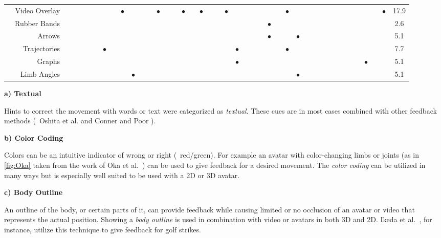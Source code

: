 \begin{table}[thp]
\begin{tiny}
{\begin{tabular}{|c|r|c|c|c|c|c|c|c|c|c|c|c|c|c|c|c|c|c|c|c|c|c|c|c|c|c|c|c|c|c|c|c|c|c|c|c|c|c|c|c|c|}
 & Video Overlay &  &  &  &  &  &  &  & $\bullet$ &  &  &  & $\bullet$ &  &  & $\bullet$ &  & $\bullet$ &  &  & $\bullet$ &  &  &  &  &  &  & $\bullet$ &  &  &  &  &  &  &  &  &  &  &  & $\bullet$ & 17.9 \\ \cline{2-42} 
 & Rubber Bands &  &  &  &  &  &  &  &  &  &  &  &  &  &  &  &  &  &  &  &  &  &  &  &  & $\bullet$ &  &  &  &  &  &  &  &  &  &  &  &  &  &  & 2.6 \\ \cline{2-42} 
 & Arrows &  &  &  &  &  &  &  &  &  &  &  &  &  &  &  &  &  &  &  &  &  &  &  &  & $\bullet$ &  &  & $\bullet$ &  &  &  &  &  &  &  &  &  &  &  & 5.1 \\ \cline{2-42} 
 & Trajectories &  &  &  &  &  & $\bullet$ &  &  &  &  &  &  &  &  &  &  &  &  &  &  & $\bullet$ &  &  &  &  &  & $\bullet$ &  &  &  &  &  &  &  &  &  &  &  &  & 7.7 \\ \cline{2-42} 
& Graphs &  &  &  &  &  &  &  &  &  &  &  &  &  &  &  &  &  &  &  &  & $\bullet$ &  &  &  &  &  &  &  &  &  &  &  &  &  &  &  & $\bullet$ &  &  & 5.1 \\ \cline{2-42} 
& Limb Angles &  &  &  &  &  &  &  &  & $\bullet$ &  &  &  &  &  &  &  &  &  &  &  &  &  &  &  &  &  &  & $\bullet$ &  &  &  &  &  &  &  &  &  &  &  & 5.1 \\ \cline{2-42}
\hline
\end{tabular}
}
\end{tiny}
\end{table}

\textbf{a) Textual}

Hints to correct the movement with words or text were categorized as \textit{textual}. These cues are in most cases combined with other feedback methods (\eg\ Oshita et al. \cite{oshita2018sts} and Conner and Poor \cite{conner2016cef}).

\textbf{b) Color Coding}

Colors can be an intuitive indicator of wrong or right (\eg\ red/green). For example an avatar with color-changing limbs or joints (as in \autoref{fig:Oka} taken from the work of Oka et al.~\cite{oka2021rtf}) can be used to give feedback for a desired movement. The \textit{color coding} can be utilized in many ways but is especially well suited to be used with a 2D or 3D avatar.

\textbf{c) Body Outline}

An outline of the body, or certain parts of it, can provide feedback while causing limited or no occlusion of an avatar or video that represents the actual position. Showing a \textit{body outline} is used in combination with video or avatars in both 3D and 2D. Ikeda et al.~\cite{ikeda2019rtp}, for instance, utilize this technique to give feedback for golf strikes.

